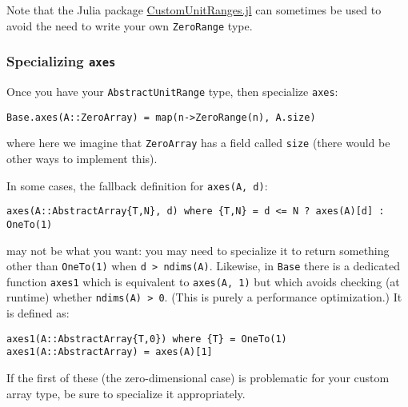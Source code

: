 Note that the Julia package \href{https://github.com/JuliaArrays/CustomUnitRanges.jl}{CustomUnitRanges.jl} can sometimes be used to avoid the need to write your own \texttt{ZeroRange} type.



\hypertarget{5545377887498946318}{}


\subsubsection{Specializing \texttt{axes}}



Once you have your \texttt{AbstractUnitRange} type, then specialize \texttt{axes}:




\begin{verbatim}
Base.axes(A::ZeroArray) = map(n->ZeroRange(n), A.size)
\end{verbatim}



where here we imagine that \texttt{ZeroArray} has a field called \texttt{size} (there would be other ways to implement this).



In some cases, the fallback definition for \texttt{axes(A, d)}:




\begin{verbatim}
axes(A::AbstractArray{T,N}, d) where {T,N} = d <= N ? axes(A)[d] : OneTo(1)
\end{verbatim}



may not be what you want: you may need to specialize it to return something other than \texttt{OneTo(1)} when \texttt{d > ndims(A)}.  Likewise, in \texttt{Base} there is a dedicated function \texttt{axes1} which is equivalent to \texttt{axes(A, 1)} but which avoids checking (at runtime) whether \texttt{ndims(A) > 0}. (This is purely a performance optimization.)  It is defined as:




\begin{verbatim}
axes1(A::AbstractArray{T,0}) where {T} = OneTo(1)
axes1(A::AbstractArray) = axes(A)[1]
\end{verbatim}



If the first of these (the zero-dimensional case) is problematic for your custom array type, be sure to specialize it appropriately.



